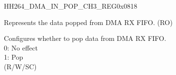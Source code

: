\begin{register}{H}{H264\_DMA\_IN\_POP\_CH3\_REG}{0x0818}\label{regdesc:H264DMAINPOPCH3REG}
%
%
%
\regnewline%
\begin{regdesc}\begin{reglist}
\label{fielddesc:H264DMAINFIFORDATACH3}\item [H264\_DMA\_INFIFO\_RDATA\_CH3] Represents the data popped from DMA RX FIFO. (RO)
\label{fielddesc:H264DMAINFIFOPOPCH3}\item [H264\_DMA\_INFIFO\_POP\_CH3] Configures whether to pop data from DMA RX FIFO.\\
0: No effect\\
1: Pop\\ (R/W/SC)
\end{reglist}\end{regdesc}
\end{register}


